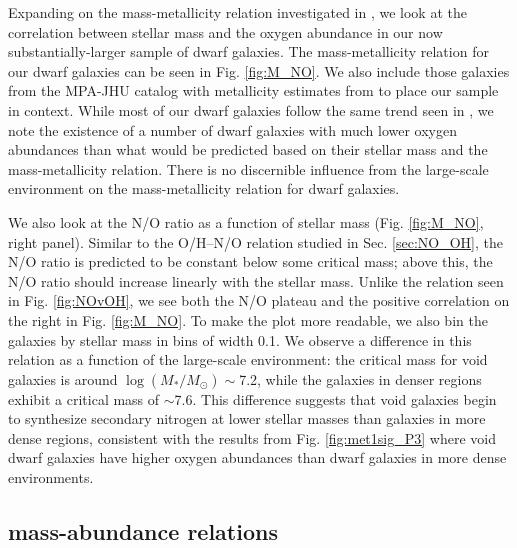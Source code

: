 Expanding on the mass-metallicity relation investigated in \cite{Douglass17a}, 
we look at the correlation between stellar mass and the oxygen abundance in our 
now substantially-larger sample of dwarf galaxies.  The mass-metallicity 
relation for our dwarf galaxies can be seen in Fig. \ref{fig:M_NO}.  We also 
include those galaxies from the MPA-JHU catalog with metallicity estimates from 
\cite{Tremonti04} to place our sample in context.  While most of our dwarf 
galaxies follow the same trend seen in \cite{Tremonti04}, we note the existence 
of a number of dwarf galaxies with much lower oxygen abundances than what would 
be predicted based on their stellar mass and the mass-metallicity relation.  
There is no discernible influence from the large-scale environment on the 
mass-metallicity relation for dwarf galaxies.

We also look at the N/O ratio as a function of stellar mass (Fig. 
\ref{fig:M_NO}, right panel).  Similar to the O/H--N/O relation studied in Sec. 
\ref{sec:NO_OH}, the N/O ratio is predicted to be constant below some critical 
mass; above this, the N/O ratio should increase linearly with the stellar mass.  
Unlike the relation seen in Fig. \ref{fig:NOvOH}, we see both the N/O plateau 
and the positive correlation on the right in Fig. \ref{fig:M_NO}.  To make the 
plot more readable, we also bin the galaxies by stellar mass in bins of width 
0.1.  We observe a difference in this relation as a function of the large-scale 
environment: the critical mass for void galaxies is around 
$\log(M_*/M_\odot) \sim$7.2, while the galaxies in denser regions exhibit a 
critical mass of $\sim$7.6.  This difference suggests that void galaxies begin 
to synthesize secondary nitrogen at lower stellar masses than galaxies in more 
dense regions, consistent with the results from Fig. \ref{fig:met1sig_P3} where 
void dwarf galaxies have higher oxygen abundances than dwarf galaxies in more 
dense environments.


\subsection{ mass-abundance relations}

